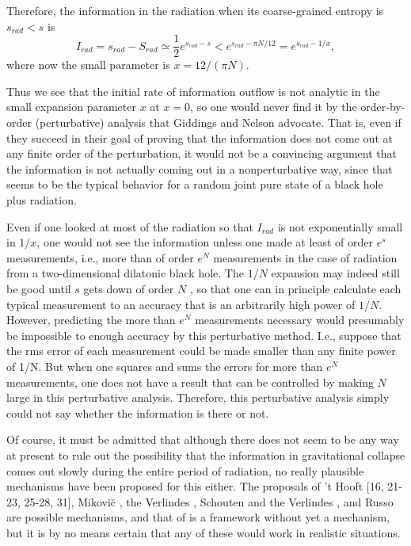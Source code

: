 \documentclass[12pt]{article}
\begin{document}
	Therefore, the information in the radiation when its
coarse-grained entropy
is $s_{rad} < s$ is
	\begin{equation}
	I_{rad}=s_{rad}-S_{rad} \simeq
\frac{1}{2}e^{s_{rad}-s}<e^{s_{rad}-\pi N/12}
	=e^{s_{rad}-1/x},
	\end{equation}
where now the small parameter is $x=12/(\pi N)$.

	Thus we see that the initial rate of information outflow is
not analytic in
the small expansion parameter $x$ at $x=0$, so one would never find
it by the
order-by-order (perturbative) analysis that Giddings and Nelson
advocate.
That is, even if they succeed in their goal of proving that the
information
does not
come out at any finite order of the perturbation, it would not be a
convincing
argument that the information is not actually coming out in a
nonperturbative
way, since that seems to be the typical behavior for a random joint
pure state
of a black hole plus radiation.

	Even if one looked at most of the radiation so that $I_{rad}$
is not
exponentially small in $1/x$, one would not see the information
unless one
made at least of order $e^s$ measurements, i.e., more than of order
$e^N$
measurements in the case of radiation from a two-dimensional
dilatonic black
hole.  The $1/N$ expansion may indeed still be good until $s$ gets
down
of order $N$ \cite{Gidpri}, so that one can in principle calculate
each
typical
measurement to an accuracy that is an arbitrarily high power of
$1/N$.
However, predicting the more than $e^N$ measurements necessary would
presumably be impossible to enough accuracy by this perturbative
method.
I.e., suppose that the rms error of each measurement could be made
smaller than any finite power of 1/N.  But when one squares and sums
the errors for more than $e^N$ measurements, one does not have
a result that can be controlled by making $N$ large in this
perturbative
analysis.  Therefore, this perturbative analysis simply could not say
whether the information is there or not.

	Of course, it must be admitted that although there does not
seem to be
any way at present to rule out the possibility that the information
in
gravitational
collapse comes out slowly during the entire period of radiation, no
really
plausible mechanisms have been proposed for this either.
The proposals of 't Hooft
[16, 21-23, 25-28, 31],
Mikovi\u{c} \cite{Mik,Mik93}, the Verlindes \cite{Ver93}, Schouten
and the
Verlindes \cite{Sch93}, and Russo \cite{Rus93} are possible
mechanisms,
and that of \cite{STU,Sus,SusT} is a framework without yet a
mechanism,
but it is by no means certain that any of these would work in
realistic
situations.
\end{document}

